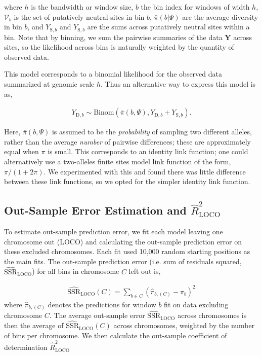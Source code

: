 \documentclass[11pt]{article}
\begin{document}
where $h$ is the bandwidth or window size, $b$ the bin index for windows of
width $h$, $\mathcal{V}_b$ is the set of putatively neutral sites in bin $b$,
$\bar{\pi}(b | \Psi)$ are the average diversity in bin $b$, and
$Y_{\text{S},b}$ and $Y_{\text{S},b}$ are the sums across putatively neutral
sites within a bin. Note that by binning, we sum the pairwise summaries of the
data $\mathbf{Y}$ across sites, so the likelihood across bins is naturally
weighted by the quantity of observed data. 



This model corresponds to a binomial likelihood for the observed data
summarized at genomic scale $h$. Thus an alternative way to express this model
is as, 

\begin{align}
  Y_{\text{D},b} \sim \text{Binom}(\bar{\pi}(b, \Psi), Y_{\text{D},b} + Y_{\text{S},b}).
\end{align}

Here, $\bar{\pi}(b, \Psi)$ is assumed to be the \emph{probability} of sampling
two different alleles, rather than the average \emph{number} of pairwise
differences; these are approximately equal when $\pi$ is small. This
corresponds to an identity link function; one could alternatively use a
two-alleles finite sites model link function of the form, $\pi/(1 + 2 \pi)$. We
experimented with this and found there was little difference between these link
functions, so we opted for the simpler identity link function.

\subsection{Out-Sample Error Estimation and $\widehat{R}_\text{LOCO}^2$}

To estimate out-sample prediction error, we fit each model leaving one
chromosome out (LOCO) and calculating the out-sample prediction error on
these excluded chromosomes. Each fit used 10,000 random starting positions as
the main fits. The out-sample prediction error (i.e. sum of residuals
squared, $\widehat{\mathrm{SSR}}_\text{LOCO}$) for all bins in chromosome $C$
left out is,

\begin{align}
    \widehat{\mathrm{SSR}}_\text{LOCO}(C) = \sum_{b \in C} (\widehat{\pi}_{b, (C)}  - \pi_b)^2
\end{align}
%
where $\widehat{\pi}_{b,(C)}$ denotes the predictions for window $b$ fit on
data excluding chromosome $C$. The average out-sample error
$\widehat{\mathrm{SSR}}_\text{LOCO}$ across chromosomes is then the average of
$\widehat{\mathrm{SSR}}_\text{LOCO}(C)$ across chromosomes, weighted by the
number of bins per chromosome. We then calculate the out-sample coefficient of
determination $\widehat{R}_\text{LOCO}^2$
\end{document}
